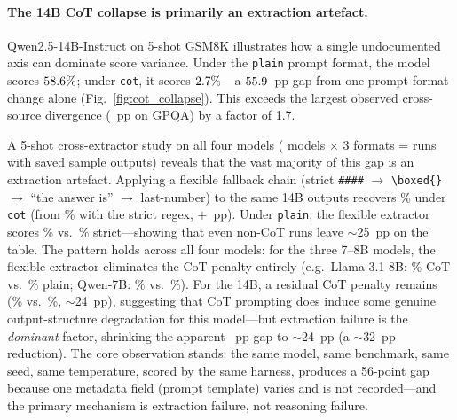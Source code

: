 \documentclass[11pt]{article}
\begin{document}
\paragraph{The 14B CoT collapse is primarily an extraction artefact.}
Qwen2.5-14B-Instruct on 5-shot GSM8K illustrates how a single
undocumented axis can dominate score variance. Under the
\texttt{plain} prompt format, the model scores
$58.6{}\%$; under \texttt{cot}, it scores
$2.7{}\%$---a $55.9{}$~pp gap from one
prompt-format change alone
(Fig.~\ref{fig:cot_collapse}). This exceeds the largest observed
cross-source divergence (\gpqagap{}~pp on GPQA) by a factor of 1.7.

A 5-shot cross-extractor study on all four models
(\crossextfivemodels{} models $\times$ 3 formats = \crossextfiveruns{}
runs with saved sample outputs) reveals that the vast majority of this
gap is an extraction artefact.
Applying a flexible fallback chain (strict \texttt{\#\#\#\#} $\to$
\texttt{\textbackslash boxed\{\}} $\to$ ``the answer is'' $\to$
last-number) to the same 14B outputs recovers
\qwenxlCotFlex{}\% under \texttt{cot} (from \qwenxlCotStrict{}\%
with the strict regex, $+$\qwenxlCotRecovery{}~pp). Under
\texttt{plain}, the flexible extractor scores
\qwenxlPlainFlex{}\% vs.\ \qwenxlPlainStrict{}\% strict---showing
that even non-CoT runs leave $\sim$25~pp on the table.
The pattern holds across all four models: for the three 7--8B models,
the flexible extractor eliminates the CoT penalty entirely
(e.g.\ Llama-3.1-8B: \llamaCotFlex{}\% CoT vs.\
\llamaPlainFlex{}\% plain; Qwen-7B: \qwenCotFlex{}\% vs.\
\qwenPlainFlex{}\%). For the 14B, a residual CoT penalty remains
(\qwenxlCotFlex{}\% vs.\ \qwenxlPlainFlex{}\%, $\sim$24~pp),
suggesting that CoT prompting does induce some genuine output-structure
degradation for this model---but extraction failure is the
\emph{dominant} factor, shrinking the apparent \cotcollapsegap{}~pp
gap to $\sim$24~pp (a $\sim$32~pp reduction).
The core observation stands: the same model, same benchmark, same
seed, same temperature, scored by the same harness, produces a
56-point gap because one metadata field (prompt template) varies and
is not recorded---and the primary mechanism is extraction failure,
not reasoning failure.
\end{document}
